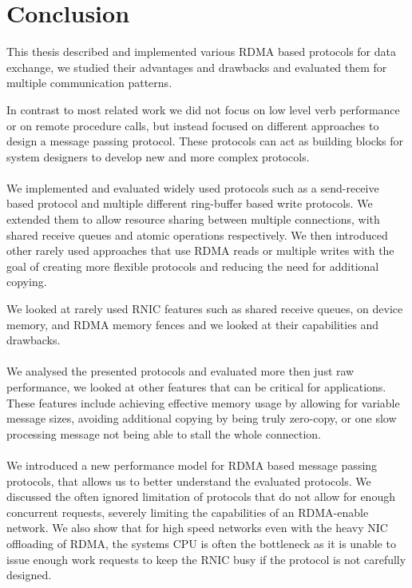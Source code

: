 \section{Conclusion}

This thesis described and implemented various RDMA based protocols for data exchange, we studied their advantages and 
drawbacks and evaluated them for multiple communication patterns.

In contrast to most related work we did not focus on low level verb performance or on remote procedure calls, but instead 
focused on different approaches to design a message passing protocol. These protocols can act as building blocks for 
system designers to develop new and more complex protocols.

\paragraph{} We implemented and evaluated widely used protocols such as a send-receive based protocol and multiple different
ring-buffer based write protocols. We extended them to allow resource sharing between multiple connections, with shared 
receive queues and atomic operations respectively. We then introduced other rarely used approaches that use RDMA reads or 
multiple writes with the goal of creating more flexible protocols and reducing the need for additional copying.

We looked at rarely used RNIC features such as shared receive queues, on device memory, and RDMA memory fences and we looked
at their capabilities and drawbacks.


\paragraph{} We analysed the presented protocols and evaluated more then just raw performance, we looked at other
features that can be critical for applications.  These features include achieving effective memory usage by allowing 
for variable message sizes, avoiding additional copying by being truly zero-copy, or one slow processing message not
being able to stall the whole connection.

\paragraph{} We introduced a new performance model for RDMA based message passing protocols, that allows us to 
better understand the evaluated protocols. We discussed the often ignored limitation of protocols that do not allow for enough
concurrent requests, severely limiting the capabilities of an RDMA-enable network. We also show that for high speed networks
even with the heavy NIC offloading of RDMA, the systems CPU is often the bottleneck as it is unable to issue enough work requests to
keep the RNIC busy if the protocol is not carefully designed.


